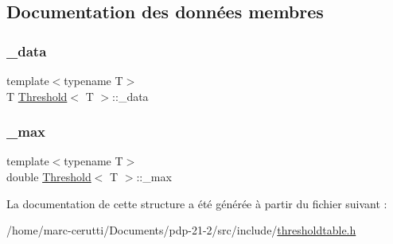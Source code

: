 \subsection{Documentation des données membres}
\mbox{\label{struct_threshold_ac2020d28bcb091ebfa9a6e967cc652a3}} 
\subsubsection{\texorpdfstring{\+\_\+data}{\_data}}
{\footnotesize\ttfamily template$<$typename T$>$ \\
T \hyperlink{struct_threshold}{Threshold}$<$ T $>$\+::\+\_\+data}

\mbox{\label{struct_threshold_a45ccfaf161df097939ca2014d990c41f}} 
\subsubsection{\texorpdfstring{\+\_\+max}{\_max}}
{\footnotesize\ttfamily template$<$typename T$>$ \\
double \hyperlink{struct_threshold}{Threshold}$<$ T $>$\+::\+\_\+max}



La documentation de cette structure a été générée à partir du fichier suivant \+:\begin{DoxyCompactItemize}
\item 
/home/marc-\/cerutti/\+Documents/pdp-\/21-\/2/src/include/\hyperlink{thresholdtable_8h}{thresholdtable.\+h}\end{DoxyCompactItemize}
